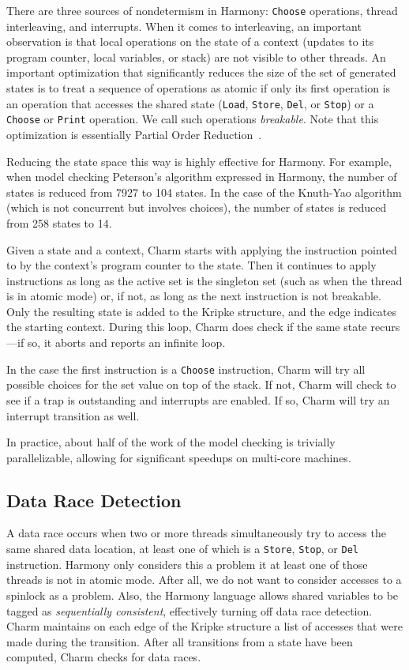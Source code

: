 \documentclass[twocolumn]{article}
\begin{document}
There are three sources of nondetermism in Harmony: \texttt{Choose}
operations, thread interleaving, and interrupts.
When it comes to interleaving, an important observation is that
local operations on the state of a context (updates to its program
counter, local variables, or stack) are not visible to other threads.
An important optimization that significantly
reduces the size of the set of generated states is to treat a
sequence of operations as atomic if only its first operation is an
operation that accesses the shared state (\texttt{Load}, \texttt{Store},
\texttt{Del}, or \texttt{Stop}) or a \texttt{Choose} or \texttt{Print}
operation.  We call such operations \emph{breakable}.
Note that this optimization is essentially Partial Order
Reduction~\cite{Val91}.

Reducing the state space this way is highly effective for Harmony.
For example, when model checking Peterson's algorithm expressed in
Harmony, the number of states is reduced from 7927 to 104 states.
In the case of the Knuth-Yao algorithm (which is not concurrent but
involves choices), the number of states is reduced from 258 states
to 14.

Given a state and a context, Charm starts with applying the instruction
pointed to by the context's program counter to the state.
Then it continues to apply instructions as long as
the active set is the singleton set (such as when the thread is in
atomic mode) or, if not, as long as the next instruction is not
breakable.  Only the resulting state is added to the Kripke structure,
and the edge indicates the starting context.  During this loop, Charm
does check if the same state recurs---if so, it aborts
and reports an infinite loop.

In the case the first instruction is a \texttt{Choose} instruction,
Charm will try all possible choices for the set value
on top of the stack.  If not, Charm will check to
see if a trap is outstanding and interrupts are enabled.  If so,
Charm will try an interrupt transition as well.

In practice, about half of the work of the model checking is trivially
parallelizable, allowing for significant speedups on multi-core machines.

\subsection{Data Race Detection}

A data race occurs when two or more threads simultaneously try to
access the same shared data location, at least one of which is a
\texttt{Store}, \texttt{Stop}, or \texttt{Del} instruction.  Harmony
only considers this a problem it at least one of those threads is
not in atomic mode.  After all, we do not want to consider accesses
to a spinlock as a problem.  Also, the Harmony language allows
shared variables to be tagged as \emph{sequentially consistent},
effectively turning off data race detection.  Charm maintains on
each edge of the Kripke structure a list of accesses that were made
during the transition.  After all transitions from a state have been
computed, Charm checks for data races.
\end{document}
